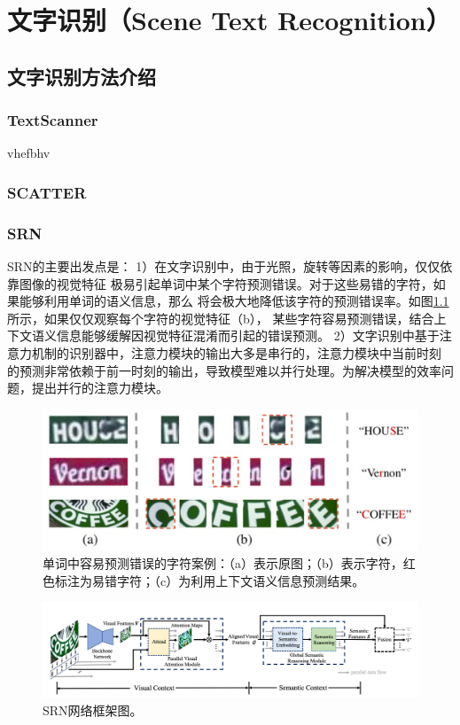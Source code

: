 \chapter{文字识别（Scene Text Recognition）}
\cite{scatter,2020srn,wan2019textscanner}
\section{文字识别方法介绍}
\subsection{TextScanner}
vhefbhv
\subsection{SCATTER}
\subsection{SRN}
SRN的主要出发点是：
1）在文字识别中，由于光照，旋转等因素的影响，仅仅依靠图像的视觉特征
极易引起单词中某个字符预测错误。对于这些易错的字符，如果能够利用单词的语义信息，那么
将会极大地降低该字符的预测错误率。如图\ref{srn_introduction}所示，如果仅仅观察每个字符的视觉特征（b），
某些字符容易预测错误，结合上下文语义信息能够缓解因视觉特征混淆而引起的错误预测。
2）文字识别中基于注意力机制的识别器中\cite{shi2018aster}，注意力模块的输出大多是串行的，注意力模块中当前时刻
的预测非常依赖于前一时刻的输出，导致模型难以并行处理。为解决模型的效率问题，提出并行的注意力模块。


\begin{figure}[H]
    \centering
    \includegraphics[width=.98\textwidth]{figure/recognition/srn_introduction.png} 
    \caption{单词中容易预测错误的字符案例：（a）表示原图；（b）表示字符，红色标注为易错字符；（c）为利用上下文语义信息预测结果。} 
    \label{srn_introduction} 
\end{figure}

\begin{figure}[H]
    \centering
    \includegraphics[width=.98\textwidth]{figure/recognition/srn_framework.png} 
    \caption{SRN网络框架图。} 
    \label{srn_framework} 
\end{figure}